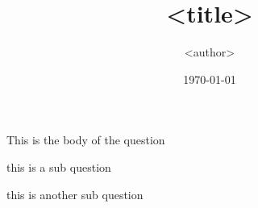 \documentclass[11pt]{homework}
\title{<title>}
\author{<author>}
\date{\today}
\begin{document}
\maketitle


\begin{question}{1}
    This is the body of the question
\end{question}

\begin{enumerate}
     this is a sub question

     this is another sub question
\end{enumerate}
\end{document}
